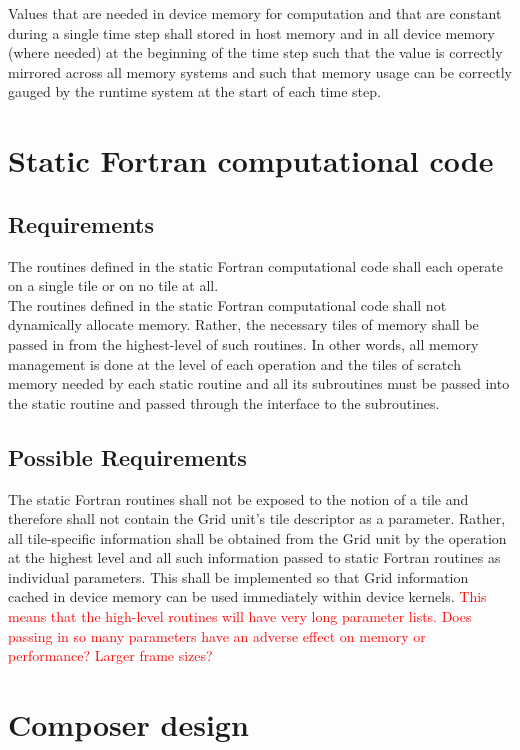 \documentclass{article}
\begin{document}
Values that are needed in device memory for computation and that are constant
during a single time step shall stored in host memory and in all device memory
(where needed) at the beginning of the time step such that the value is
correctly mirrored across all memory systems and such that memory usage can be
correctly gauged by the runtime system at the start of each time step.

\section{Static Fortran computational code}
\subsection{Requirements}
The routines defined in the static Fortran computational code shall each operate
on a single tile or on no tile at all.\\

The routines defined in the static Fortran computational code shall not
dynamically allocate memory.  Rather, the necessary tiles of memory shall be
passed in from the highest-level of such routines.  In other words, all memory
management is done at the level of each operation and the tiles of scratch
memory needed by each static routine and all its subroutines must be passed into
the static routine and passed through the interface to the subroutines.

\subsection{Possible Requirements}
The static Fortran routines shall not be exposed to the notion of a tile and
therefore shall not contain the Grid unit's tile descriptor as a parameter.
Rather, all tile-specific information shall be obtained from the Grid unit by
the operation at the highest level and all such information passed to static
Fortran routines as individual parameters.  This shall be implemented so that
Grid information cached in device memory can be used immediately within device
kernels.  \textcolor{red}{This means that the high-level routines will have very
long parameter lists.  Does passing in so many parameters have an adverse effect
on memory or performance?  Larger frame sizes?}

\section{Composer design}
\end{document}
